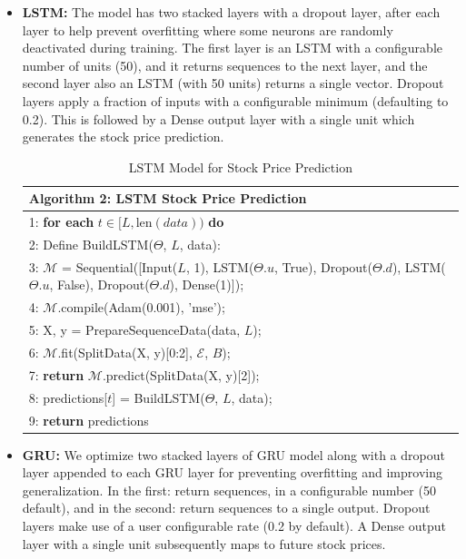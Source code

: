 \begin{itemize}
    \item \textbf{LSTM:} The model has two stacked layers with a dropout layer, after each layer to help prevent overfitting where some neurons are randomly deactivated during training. The first layer is an LSTM with a configurable number of units (50), and it returns sequences to the next layer, and the second layer also an LSTM (with 50 units) returns a single vector. Dropout layers apply a fraction of inputs with a configurable minimum (defaulting to 0.2). This is followed by a Dense output layer with a single unit which generates the stock price prediction.
    
    \begin{table}[h]
    \small
    \centering
    \begin{tabular}{|p{10cm}|}
    \hline
    \textbf{Algorithm 2: LSTM Stock Price Prediction} \\
    \hline
    1: \textbf{for each} $t \in [L, \text{len}(data))$ \textbf{do} \\
    2: \quad Define BuildLSTM($\Theta$, $L$, data): \\
    3: \quad\quad $\mathcal{M}$ = Sequential([Input($L$, 1), LSTM($\Theta.u$, True), Dropout($\Theta.d$), LSTM($\Theta.u$, False), Dropout($\Theta.d$), Dense(1)]); \\
    4: \quad\quad $\mathcal{M}$.compile(Adam(0.001), 'mse'); \\
    5: \quad\quad X, y = PrepareSequenceData(data, $L$); \\
    6: \quad\quad $\mathcal{M}$.fit(SplitData(X, y)[0:2], $\mathcal{E}$, $B$); \\
    7: \quad\quad \textbf{return} $\mathcal{M}$.predict(SplitData(X, y)[2]); \\
    8: \quad predictions[$t$] = BuildLSTM($\Theta$, $L$, data); \\
    9: \textbf{return} predictions \\
    \hline
    \end{tabular}
    \caption{LSTM Model for Stock Price Prediction}
    \label{tab:lstm_predictor}
    \end{table}
    

    \item \textbf{GRU: } We optimize two stacked layers of GRU model along with a dropout layer appended to each GRU layer for preventing overfitting and improving generalization. In the first: return sequences, in a configurable number (50 default), and in the second: return sequences to a single output. Dropout layers make use of a user configurable rate (0.2 by default). A Dense output layer with a single unit subsequently maps to future stock prices.
    

\end{itemize}
